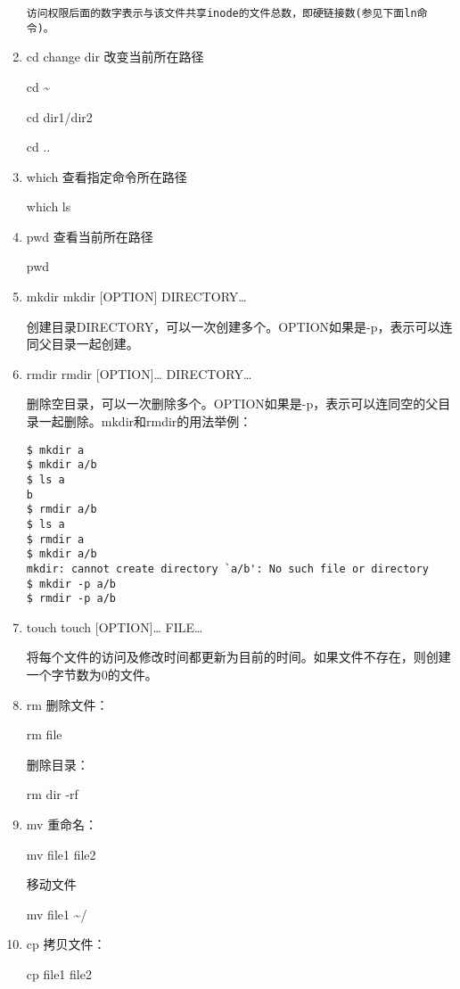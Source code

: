 \documentclass[11pt]{article}
\begin{document}
\begin{enumerate}
\begin{verbatim}
访问权限后面的数字表示与该文件共享inode的文件总数，即硬链接数(参见下面ln命令)。
\end{verbatim}
\item cd
\label{sec-1-1-2-5}
change dir 改变当前所在路径

cd \textasciitilde{}

cd dir1/dir2

cd ..

\item which
\label{sec-1-1-2-6}
查看指定命令所在路径

which ls

\item pwd
\label{sec-1-1-2-7}
查看当前所在路径

pwd

\item mkdir
\label{sec-1-1-2-8}
mkdir [OPTION] DIRECTORY\ldots{}

创建目录DIRECTORY，可以一次创建多个。OPTION如果是-p，表示可以连同父目录一起创建。 
\item rmdir
\label{sec-1-1-2-9}
rmdir [OPTION]\ldots{} DIRECTORY\ldots{}

删除空目录，可以一次删除多个。OPTION如果是-p，表示可以连同空的父目录一起删除。mkdir和rmdir的用法举例： 

\begin{verbatim}
$ mkdir a
$ mkdir a/b
$ ls a
b
$ rmdir a/b
$ ls a
$ rmdir a
$ mkdir a/b
mkdir: cannot create directory `a/b': No such file or directory
$ mkdir -p a/b
$ rmdir -p a/b
\end{verbatim}
\item touch
\label{sec-1-1-2-10}
touch [OPTION]\ldots{} FILE\ldots{}

将每个文件的访问及修改时间都更新为目前的时间。如果文件不存在，则创建一个字节数为0的文件。 

\item rm
\label{sec-1-1-2-11}
删除文件：

rm file

删除目录：

rm dir -rf

\item mv
\label{sec-1-1-2-12}
重命名：

mv file1 file2

移动文件

mv file1 \textasciitilde{}/

\item cp
\label{sec-1-1-2-13}
拷贝文件：

cp file1 file2


\end{enumerate}
\end{document}
